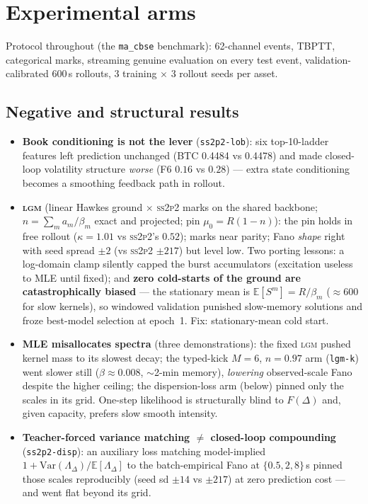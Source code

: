 \documentclass[11pt]{article}
\newcommand{\sspp}{\textsc{ss2p2}}
\newcommand{\lgm}{\textsc{lgm}}
\newcommand{\Fano}{F}
\begin{document}
\section{Experimental arms}

Protocol throughout (the \texttt{ma\_cbse} benchmark): 62-channel events, TBPTT,
categorical marks, streaming genuine evaluation on every test event, validation-
calibrated 600\,s rollouts, 3 training $\times$ 3 rollout seeds per asset.

\subsection{Negative and structural results}
\begin{itemize}
\item \textbf{Book conditioning is not the lever} (\texttt{ss2p2-lob}): six
top-10-ladder features left prediction unchanged (BTC 0.4484 vs 0.4478) and made
closed-loop volatility structure \emph{worse} (F6 $0.16$ vs $0.28$) --- extra state
conditioning becomes a smoothing feedback path in rollout.
\item \textbf{\lgm{}} (linear Hawkes ground $\times$ \sspp{} marks on the shared
backbone; $n=\sum_m a_m/\beta_m$ exact and projected; pin $\mu_0=R(1-n)$): the pin
holds in free rollout ($\kappa=1.01$ vs \sspp{}'s $0.52$); marks near parity; Fano
\emph{shape} right with seed spread $\pm 2$ (vs \sspp{} $\pm 217$) but level low.
Two porting lessons: a log-domain clamp silently capped the burst accumulators
(excitation useless to MLE until fixed); and \textbf{zero cold-starts of the ground
are catastrophically biased} --- the stationary mean is $\mathbb{E}[S^m]=R/\beta_m$
($\approx 600$ for slow kernels), so windowed validation punished slow-memory
solutions and froze best-model selection at epoch~1. Fix: stationary-mean cold start.
\item \textbf{MLE misallocates spectra} (three demonstrations): the fixed \lgm{}
pushed kernel mass to its slowest decay; the typed-kick $M{=}6$, $n{=}0.97$ arm
(\texttt{lgm-k}) went slower still ($\beta\!\approx\!0.008$, $\sim$2-min memory),
\emph{lowering} observed-scale Fano despite the higher ceiling; the dispersion-loss
arm (below) pinned only the scales in its grid. One-step likelihood is structurally
blind to $\Fano(\Delta)$ and, given capacity, prefers slow smooth intensity.
\item \textbf{Teacher-forced variance matching $\ne$ closed-loop compounding}
(\texttt{ss2p2-disp}): an auxiliary loss matching model-implied
$1+\mathrm{Var}(\Lambda_\Delta)/\mathbb{E}[\Lambda_\Delta]$ to the batch-empirical
Fano at $\{0.5,2,8\}$\,s pinned those scales reproducibly (seed sd $\pm14$ vs
$\pm217$) at zero prediction cost --- and went flat beyond its grid.
\end{itemize}
\end{document}
